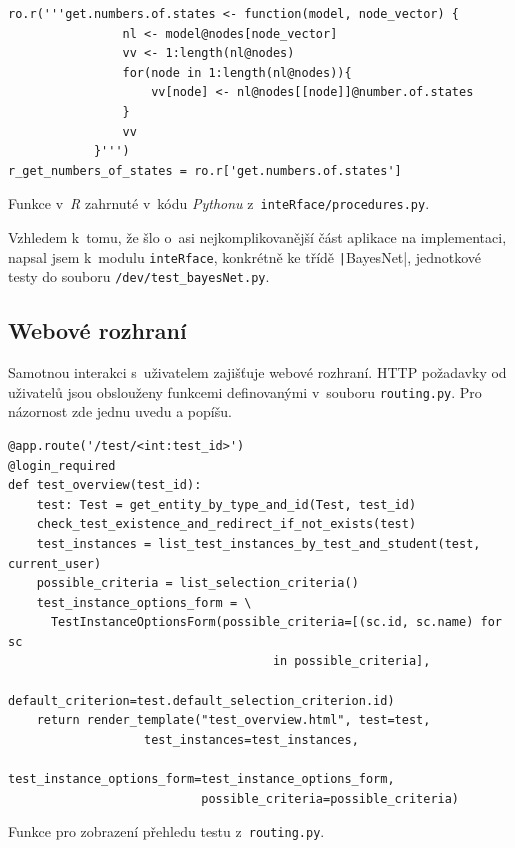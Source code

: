 \documentclass[a4paper,twoside,12pt]{scrbook}
\begin{document}
\begin{listing}
\centering
\begin{verbatim}
ro.r('''get.numbers.of.states <- function(model, node_vector) {
                nl <- model@nodes[node_vector]
                vv <- 1:length(nl@nodes)
                for(node in 1:length(nl@nodes)){
                    vv[node] <- nl@nodes[[node]]@number.of.states
                }
                vv
            }''')
r_get_numbers_of_states = ro.r['get.numbers.of.states']
\end{verbatim}
\caption{Funkce v~\textit{R} zahrnuté v~kódu \textit{Pythonu} z~\texttt{inteRface/procedures.py}.}
\label{lst:PyR}
\end{listing}

Vzhledem k~tomu, že šlo o~asi nejkomplikovanější část aplikace na implementaci, napsal jsem k~modulu \texttt{inteRface}, konkrétně ke třídě \texttt|BayesNet|, jednotkové testy do souboru \texttt{/dev/test\_bayesNet.py}.

\subsection{Webové rozhraní}
Samotnou interakci s~uživatelem zajišťuje webové rozhraní. HTTP požadavky od uživatelů jsou obslouženy funkcemi definovanými v~souboru \texttt{routing.py}. Pro názornost zde jednu uvedu a popíšu.

\begin{listing}
\centering
\begin{verbatim}
@app.route('/test/<int:test_id>')
@login_required
def test_overview(test_id):
    test: Test = get_entity_by_type_and_id(Test, test_id)
    check_test_existence_and_redirect_if_not_exists(test)
    test_instances = list_test_instances_by_test_and_student(test, current_user)
    possible_criteria = list_selection_criteria()
    test_instance_options_form = \
      TestInstanceOptionsForm(possible_criteria=[(sc.id, sc.name) for sc
			                         in possible_criteria],
                              default_criterion=test.default_selection_criterion.id)
    return render_template("test_overview.html", test=test,
		           test_instances=test_instances,
                           test_instance_options_form=test_instance_options_form,
                           possible_criteria=possible_criteria)

\end{verbatim}
\caption{Funkce pro zobrazení přehledu testu z~\texttt{routing.py}.}
\label{lst:test_view}
\end{listing}
\end{document}
